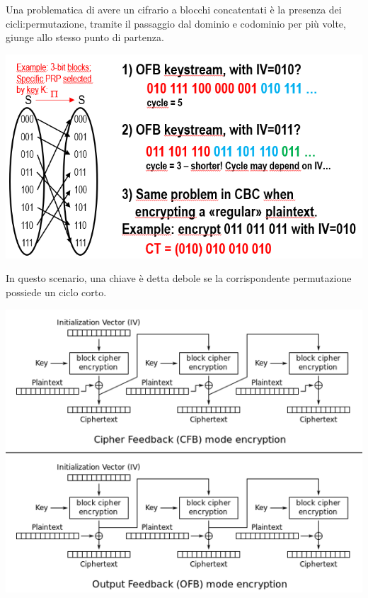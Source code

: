 \documentclass{book}
\theoremstyle{remark}
\begin{document}
Una problematica di avere un cifrario a blocchi concatentati è la presenza dei cicli:\@qualche permutazione, tramite il passaggio dal dominio e codominio per più volte, giunge allo stesso punto di partenza\@.
\begin{center}
	\includegraphics[scale=0.5]{ShortCycle.png}
\end{center}
In questo scenario, una chiave è detta debole se la corrispondente permutazione possiede un ciclo corto\@.
\begin{center}
	\includegraphics[scale=0.7]{CFBOFB.png}
\end{center}
\end{document}
